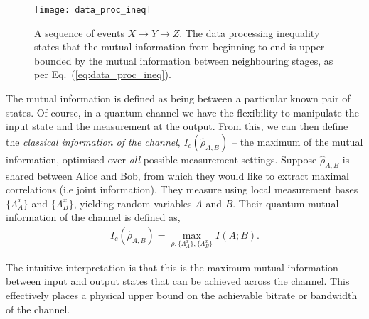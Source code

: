 \begin{figure}[!htbp]
\texttt{[image: data\_proc\_ineq]}
\captionspacefig \caption{\label{fig:data_proc_ineq}A sequence of events \mbox{$X\to Y\to Z$}. The data processing inequality states that the mutual information from beginning to end is upper-bounded by the mutual information between neighbouring stages, as per Eq.~(\ref{eq:data_proc_ineq}).}	
\end{figure}

The mutual information is defined as being between a particular known pair of states. Of course, in a quantum channel we have the flexibility to manipulate the input state and the measurement at the output. From this, we can then define the \textit{classical information of the channel}, $I_c(\hat\rho_{A,B})$ -- the maximum of the mutual information, optimised over \textit{all} possible measurement settings. Suppose $\hat\rho_{A,B}$ is shared between Alice and Bob, from which they would like to extract maximal correlations (i.e joint information). They measure using local measurement bases $\{\Lambda_A^x\}$ and $\{\Lambda_B^x\}$, yielding random variables $A$ and $B$. Their quantum mutual information of the channel is defined as,
\begin{align}
I_c(\hat\rho_{A,B}) = \max_{\rho,\{\Lambda_A^x\},\{\Lambda_B^x\}} I(A;B). \label{eq:quant_mut}
\end{align}

The intuitive interpretation is that this is the maximum mutual information between input and output states that can be achieved across the channel. This effectively places a physical upper bound on the achievable bitrate or bandwidth of the channel.